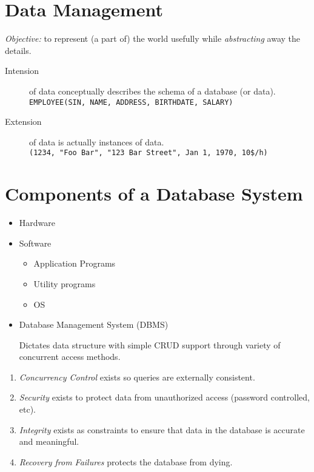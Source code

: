             \section{Data Management} %
            \label{sec:data_management}
                \emph{Objective:} to represent (a part of) the world usefully while \emph{abstracting} away the details.
                \begin{description}
                    \item[Intension] of data conceptually describes the schema of a database (or data). \\
                        \verb|EMPLOYEE(SIN, NAME, ADDRESS, BIRTHDATE, SALARY)|
                    \item[Extension] of data is actually instances of data. \\
                        \verb|(1234, "Foo Bar", "123 Bar Street", Jan 1, 1970, 10$/h)|
                \end{description}
            \section{Components of a Database System} %
            \label{sec:components_of_a_database_system}
                \begin{itemize}
                    \item Hardware
                    \item Software
                        \begin{itemize}
                            \item Application Programs
                            \item Utility programs
                            \item OS
                        \end{itemize}
                    \item Database Management System (DBMS)

                        Dictates data structure with simple CRUD support through variety of concurrent access methods.
                \end{itemize}

                \begin{enumerate}
                    \item \emph{Concurrency Control} exists so queries are externally consistent.
                    \item \emph{Security} exists to protect data from unauthorized access (password controlled, etc).
                    \item \emph{Integrity} exists as constraints to ensure that data in the database is accurate and meaningful.
                    \item \emph{Recovery from Failures} protects the database from dying.
                \end{enumerate}
